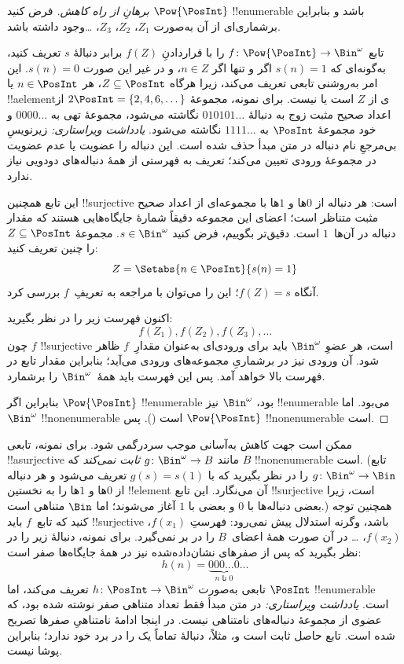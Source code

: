 \documentclass[../../../include/open-logic-section]{subfiles}
\begin{document}
\begin{proof}[برهانِ {} از راه کاهش]
فرض کنید $\Pow{\PosInt}$ !!{enumerable} باشد و بنابراین برشماری‌ای از
آن به‌صورت $Z_{1}$، $Z_{2}$، $Z_{3}$، \dots وجود داشته باشد.

تابع $f \colon \Pow{\PosInt} \to \Bin^\omega$ را با قراردادنِ
$f(Z)$ برابر دنبالهٔ $s$ تعریف کنید، به‌گونه‌ای که $s(n) = 1$ اگر و تنها
اگر $n \in Z$، و در غیر این صورت $s(n) = 0$. این امر به‌روشنی تابعی
تعریف می‌کند، زیرا هرگاه $Z \subseteq \PosInt$، هر $n \in \PosInt$ یا
!!a{element}ی از $Z$ است یا نیست. برای نمونه، مجموعهٔ $2\PosInt = \{2,
4, 6, \dots\}$ از اعداد صحیح مثبت زوج به دنبالهٔ $010101\dots$ نگاشته
می‌شود، مجموعهٔ تهی به $0000\dots$ و خود مجموعهٔ $\PosInt$ به
$1111\dots$ نگاشته می‌شود.
\emph{یادداشت ویراستاری:} زیرنویسِ بی‌مرجعِ نام دنباله در متن مبدأ حذف شده است.
این دنباله را عضویت یا عدم عضویت در مجموعهٔ ورودی تعیین می‌کند؛
تعریف به فهرستی از همهٔ دنباله‌های دودویی نیاز ندارد.

این تابع همچنین !!{surjective} است: هر دنباله از $0$ها و $1$ها با
مجموعه‌ای از اعداد صحیح مثبت متناظر است؛ اعضای این مجموعه دقیقاً شمارهٔ
جایگاه‌هایی هستند که مقدار دنباله در آن‌ها~$1$ است. دقیق‌تر بگوییم، فرض کنید $s \in \Bin^\omega$. مجموعهٔ $Z
\subseteq \PosInt$ را چنین تعریف کنید:
\[
Z = \Setabs{n \in \PosInt}{s(n) = 1}
\]
آنگاه $f(Z) = s$؛ این را می‌توان با مراجعه به تعریفِ~$f$ بررسی کرد.

اکنون فهرست زیر را در نظر بگیرید:
\[
f(Z_1), f(Z_2), f(Z_3), \dots
\]
چون $f$ !!{surjective} است، هر عضوِ $\Bin^\omega$ باید برای ورودی‌ای
به‌عنوان مقدارِ~$f$ ظاهر شود. آن ورودی نیز در برشماریِ مجموعه‌های ورودی
می‌آید؛ بنابراین مقدار تابع در فهرست بالا خواهد آمد. پس این
فهرست باید همهٔ~$\Bin^\omega$ را برشمارد.

بنابراین اگر $\Pow{\PosInt}$ !!{enumerable} بود، $\Bin^\omega$ نیز
!!{enumerable} می‌بود. اما $\Bin^\omega$ !!{nonenumerable} است
(). پس $\Pow{\PosInt}$
!!{nonenumerable} است.
\end{proof}

\begin{explain}
ممکن است جهت کاهش به‌آسانی موجب سردرگمی شود. برای نمونه، تابعی
!!a{surjective} مانند $g \colon \Bin^\omega \to B$ \emph{ثابت نمی‌کند}
که $B$ !!{nonenumerable} است. (تابع $g
\colon \Bin^\omega \to \Bin$ را در نظر بگیرید که با $g(s) = s(1)$
تعریف می‌شود و هر دنباله از $0$ها و $1$ها را به نخستین !!{element} آن
می‌نگارد. این تابع !!{surjective} است، زیرا بعضی دنباله‌ها با $0$ و
بعضی با $1$ آغاز می‌شوند؛ اما $\Bin$ متناهی است.) همچنین توجه کنید که
تابع~$f$ باید !!{surjective} باشد، وگرنه استدلال پیش نمی‌رود:
فهرستِ $f(x_1)$، $f(x_2)$، \dots{} در آن صورت همهٔ
اعضای~$B$ را در بر نمی‌گیرد. برای نمونه، دنبالهٔ زیر را در نظر بگیرید که
پس از صفرهای نشان‌داده‌شده نیز در همهٔ جایگاه‌ها صفر است:
\[
h(n) = \underbrace{000\dots0}_{\text{$n$ تا $0$}}\dots
\]
تابعی به‌صورت $h\colon \PosInt \to
\Bin^\omega$ تعریف می‌کند، اما $\PosInt$ !!{enumerable} است.
\emph{یادداشت ویراستاری:} در متن مبدأ فقط تعداد متناهی صفر نوشته شده بود،
که عضوی از مجموعهٔ دنباله‌های نامتناهی نیست. در اینجا ادامهٔ نامتناهیِ
صفرها تصریح شده است. تابع حاصل ثابت است و، مثلاً، دنبالهٔ تماماً یک را
در برد خود ندارد؛ بنابراین پوشا نیست.
\end{explain}
\end{document}
